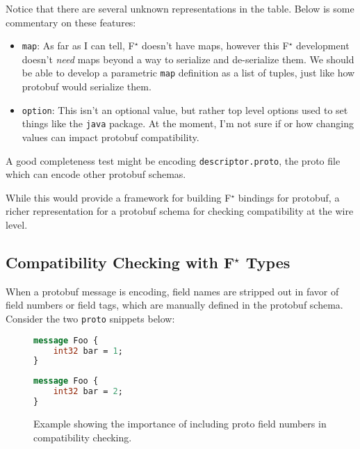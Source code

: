 \documentclass[11pt]{article}
\newcommand{\fstar}{F\(^\star\)}
\begin{document}
Notice that there are several unknown representations in the table. Below is
some commentary on these features:

\begin{itemize}
	\item \texttt{map}: As far as I can tell, \fstar{} doesn't have maps, however
	      this \fstar{} development doesn't \emph{need} maps beyond a way to serialize
	      and de-serialize them. We should be able to develop a parametric
	      \texttt{map} definition as a list of tuples, just like how protobuf would
	      serialize them.
	\item \texttt{option}: This isn't an optional value, but rather top level
	      options used to set things like the \texttt{java} package. At the moment,
	      I'm not sure if or how changing values can impact protobuf compatibility.
\end{itemize}

A good completeness test might be encoding \texttt{descriptor.proto}, the proto
file which can encode other protobuf schemas.

While this would provide a framework for building \fstar{} bindings for
protobuf, a richer representation for a protobuf schema for checking
compatibility at the wire level.

\subsection{Compatibility Checking with \fstar{} Types}

When a protobuf message is encoding, field names are stripped out in favor of
field numbers or field tags, which are manually defined in the protobuf
schema. Consider the two \texttt{proto} snippets below:

\begin{figure}[H]
	\centering
	\begin{minipage}[bt]{0.4\textwidth}
		\begin{lstlisting}[language=proto]
message Foo {
    int32 bar = 1;
}\end{lstlisting}
	\end{minipage}
	\hspace{1cm}
	\begin{minipage}[bt]{0.4\textwidth}
		\begin{lstlisting}[language=proto]
message Foo {
    int32 bar = 2;
}\end{lstlisting}
	\end{minipage}

	\caption[]{Example showing the importance of including proto field numbers in
		compatibility checking.}
\end{figure}
\end{document}

